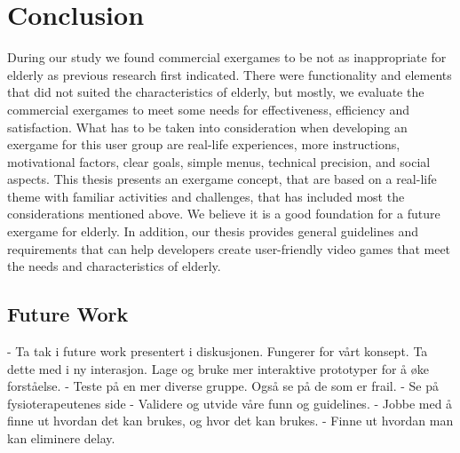 \chapter{Conclusion}

During our study we found commercial exergames to be not as inappropriate for elderly as previous research first indicated. There were functionality and elements that did not suited the characteristics of elderly, but mostly, we evaluate the commercial exergames to meet some needs for effectiveness, efficiency and satisfaction.  What has to be taken into consideration when developing an exergame for this user group are real-life experiences, more instructions, motivational factors, clear goals, simple menus, technical precision, and social aspects. This thesis presents an exergame concept, that are based on a real-life theme with familiar activities and challenges, that has included most the considerations mentioned above. We believe it is a good foundation for a future exergame for elderly. In addition, our thesis provides general guidelines and requirements that can help developers create user-friendly video games that meet the needs and characteristics of elderly.  

\section{Future Work}

- Ta tak i future work presentert i diskusjonen. Fungerer for vårt konsept. Ta dette med i ny interasjon. Lage og bruke mer interaktive prototyper for å øke forståelse. 
- Teste på en mer diverse gruppe. Også se på de som er frail. 
- Se på fysioterapeutenes side
- Validere og  utvide våre funn og guidelines.  
- Jobbe med å finne ut hvordan det kan brukes, og hvor det kan brukes.
- Finne ut hvordan man kan eliminere delay.
